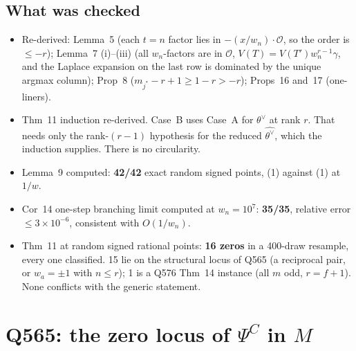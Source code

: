 \documentclass[11pt]{amsart}
\newcommand{\PsiC}{\Psi^{C}}
\begin{document}
\subsection*{What was checked}
\begin{itemize}[leftmargin=2em]
\item Re-derived: Lemma~5 (each $t=n$ factor lies in $-(x/w_n)\cdot\mathcal O$, so the order is
$\le -r$); Lemma~7 (i)--(iii) (all $w_n$-factors are in $\mathcal O$,
$V(T)=V(T')w_n^{r-1}\gamma$, and the Laplace expansion on the last row is dominated by the unique
argmax column); Prop~8 ($m_{j^*}-r+1\ge 1-r>-r$); Props~16 and~17 (one-liners).
\item Thm~11 induction re-derived. Case~B uses Case~A for $\theta^\vee$ at rank $r$. That needs
only the rank-$(r-1)$ hypothesis for the reduced $\widehat{\theta^\vee}$, which the induction
supplies. There is no circularity.
\item Lemma~9 computed: \textbf{42/42} exact random signed points, (1) against (1) at $1/w$.
\item Cor~14 one-step branching limit computed at $w_n=10^7$: \textbf{35/35}, relative error
$\le 3\times10^{-6}$, consistent with $O(1/w_n)$.
\item Thm~11 at random signed rational points: \textbf{16 zeros} in a 400-draw resample, every one
classified. 15 lie on the structural locus of Q565 (a reciprocal pair, or $w_a=\pm1$ with
$n\le r$); 1 is a Q576 Thm~14 instance (all $m$ odd, $r=f+1$). None conflicts with the generic
statement.
\end{itemize}

\section{Q565: the zero locus of $\PsiC$ in $M$}
\end{document}
